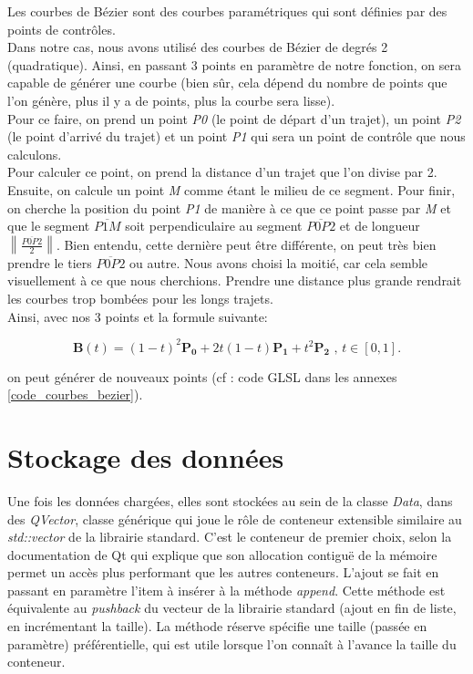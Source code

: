 \documentclass[12pt]{article}
\begin{document}
		Les courbes de Bézier sont des courbes paramétriques qui sont définies par
		des points de contrôles.\\
		Dans notre cas, nous avons utilisé des courbes de Bézier de degrés 2 (quadratique). Ainsi,
		en passant 3 points en paramètre de notre fonction, on sera capable de générer une
		courbe (bien sûr, cela dépend du nombre de points que l'on génère, plus il y a de points,
		plus la courbe sera lisse).\\
		Pour ce faire, on prend un point \textit{P0} (le point de départ d'un trajet), un
		point \textit{P2} (le point d'arrivé du trajet) et un point \textit{P1} qui sera
		un point de contrôle que nous calculons.\\
		Pour calculer ce point, on prend la distance d'un trajet que l'on divise par 2. Ensuite,
		on calcule un point \textit{M} comme étant le milieu de ce segment. Pour finir, on cherche la
		position du point \textit{P1} de manière à ce que ce point passe par \textit{M} et que le
		segment $\overline{P1 M}$ soit perpendiculaire au segment $\overline{P0 P2}$ et
		de longueur $\left\lVert \frac{\overline{P0 P2}}{2}\right\rVert$. Bien entendu, cette
		dernière peut être différente, on peut très bien prendre le tiers $\overline{P0 P2}$ ou autre.
		Nous avons choisi la moitié, car cela semble visuellement à ce que nous cherchions. Prendre
		une distance plus grande rendrait les courbes trop bombées pour les longs trajets. \\
		
		Ainsi, avec nos 3 points et la formule suivante:
		
		\[
			{\mathbf  {B}}(t)=(1-t)^{{2}}{\mathbf  {P_{0}}}+2t(1-t){\mathbf  {P_{1}}}+t^{{2}}{\mathbf  {P_{2}}}{\mbox{ , }}t\in [0,1].
		\]
		
		on peut générer de nouveaux points (cf : code GLSL dans les annexes \ref{code_courbes_bezier}).
	
	\newpage
	\section{Stockage des données}
	Une fois les données chargées, elles sont stockées au sein de la classe \textit{Data}, dans des \textit{QVector}, classe générique qui joue le rôle de conteneur extensible similaire au \textit{std::vector} de la librairie standard. C'est le conteneur de premier choix, selon la documentation de Qt qui explique que son allocation contiguë de la mémoire permet un accès plus performant que les autres conteneurs.
	L’ajout se fait en passant en paramètre l’item à insérer à la méthode \textit{append}. Cette méthode est équivalente au \textit{pushback} du vecteur de la librairie standard (ajout en fin de liste, en incrémentant la taille). La méthode réserve spécifie une taille (passée en paramètre) préférentielle, qui est utile lorsque l’on connaît à l’avance la taille du conteneur.\\
\end{document}
